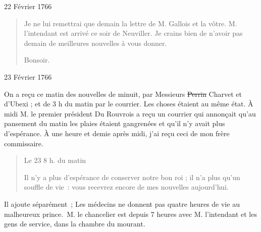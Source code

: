 \begin{diary}{22 Février 1766}{}
\begin{quote}
         Je ne lui remettrai que demain la lettre
                              de M. Gallois et la vôtre.
                                 M. l'intendant
                              est arrivé ce soir de Neuviller. Je crains
                              bien de n'avoir pas demain de meilleures
                              nouvelles à vous donner. \bigskip
        
         Bonsoir. \bigskip
        
        \end{quote}
                     \end{diary}

                     \begin{diary}{23 Février 1766}{}
                        
                         On a reçu ce matin des nouvelles de
                              minuit,
                           par Messieurs
                           \sout{Perrin} Charvet et d'Ubexi ; et de 3 h
                              du matin par le courrier. Les choses étaient au même état. À
                           midi M. le premier président
                              Du Rouvrois a reçu un courrier qui
                           annonçait qu'au pansement du matin
                           les plaies étaient gangrenées et qu'il n'y
                           avait plus d'espérance. À une
                              heure
                              et demie après midi, j'ai reçu ceci
                           de mon frère commissaire. \bigskip
        
        
                        \begin{quote}\begin{flushright}Le 23 8 h. du
                                 matin\end{flushright}
                              Il n'y a plus d'espérance de conserver
                              notre bon roi ; il n'a
                              plus qu'un souffle
                              de vie : vous recevrez encore de mes
                              nouvelles aujourd'hui. \bigskip
        
        \end{quote}
                         Il ajoute séparément ; \og 
                              Les médecins ne donnent pas quatre heures
                              de vie au malheureux
                                 prince. M. le
                                 chancelier est depuis 7 heures avec M.
                                 l'intendant et les gens de service, dans
                              la chambre du mourant.  \fg{}
                        \bigskip
        

\end{diary}

